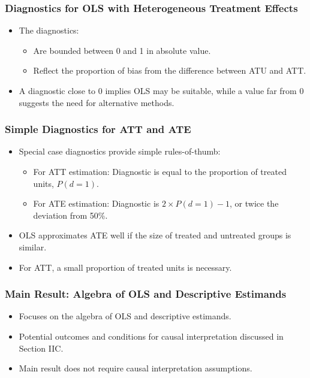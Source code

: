 \documentclass{beamer}
\begin{document}
\begin{frame}
\frametitle{Diagnostics for OLS with Heterogeneous Treatment Effects}
\begin{itemize}
  \item The diagnostics:
    \begin{itemize}
      \item Are bounded between 0 and 1 in absolute value.
      \item Reflect the proportion of bias from the difference between ATU and ATT.
    \end{itemize}
  \item A diagnostic close to 0 implies OLS may be suitable, while a value far from 0 suggests the need for alternative methods.
\end{itemize}
\end{frame}


\begin{frame}
\frametitle{Simple Diagnostics for ATT and ATE}
\begin{itemize}
  \item Special case diagnostics provide simple rules-of-thumb:
    \begin{itemize}
      \item For ATT estimation: Diagnostic is equal to the proportion of treated units, \( P(d = 1) \).
      \item For ATE estimation: Diagnostic is \( 2 \times P(d = 1) - 1 \), or twice the deviation from 50\%.
    \end{itemize}
  \item OLS approximates ATE well if the size of treated and untreated groups is similar.
  \item For ATT, a small proportion of treated units is necessary.
\end{itemize}
\end{frame}






\begin{frame}
\frametitle{Main Result: Algebra of OLS and Descriptive Estimands}
\begin{itemize}
    \item Focuses on the algebra of OLS and descriptive estimands.
    \item Potential outcomes and conditions for causal interpretation discussed in Section IIC.
    \item Main result does not require causal interpretation assumptions.
\end{itemize}
\end{frame}
\end{document}
